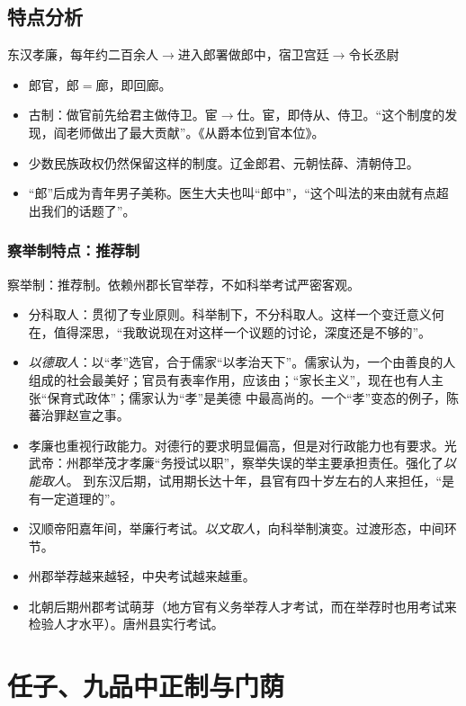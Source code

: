 \documentclass[twoside]{article}
\begin{document}
\subsection{特点分析}
东汉孝廉，每年约二百余人$\rightarrow$进入郎署做郎中，宿卫宫廷$\rightarrow$令长丞尉
\begin{itemize}
	\item 郎官，郎$=$廊，即回廊。
	\item 古制：做官前先给君主做侍卫。宦$\rightarrow$仕。宦，即侍从、侍卫。``这个制度的发现，阎老师做出了最大贡献''。《从爵本位到官本位》。
	\item 少数民族政权仍然保留这样的制度。辽金郎君、元朝怯薛、清朝侍卫。
	\item ``郎''后成为青年男子美称。医生大夫也叫``郎中''，``这个叫法的来由就有点超出我们的话题了''。
\end{itemize}
\subsubsection{察举制特点：推荐制}
察举制：推荐制。依赖州郡长官举荐，不如科举考试严密客观。
\begin{itemize}
	\item 分科取人：贯彻了专业原则。科举制下，不分科取人。这样一个变迁意义何在，值得深思，``我敢说现在对这样一个议题的讨论，深度还是不够的''。
	\item \textit{以德取人}：以``孝''选官，合于儒家``以孝治天下''。儒家认为，一个由善良的人组成的社会最美好；官员有表率作用，应该由；``家长主义''，现在也有人主张``保育式政体''；儒家认为``孝''是美德
	中最高尚的。一个``孝''变态的例子，陈蕃治罪赵宣之事。
	\item 孝廉也重视行政能力。对德行的要求明显偏高，但是对行政能力也有要求。光武帝：州郡举茂才孝廉``务授试以职''，察举失误的举主要承担责任。强化了\textit{以能取人}。
	到东汉后期，试用期长达十年，县官有四十岁左右的人来担任，``是有一定道理的''。
	\item 汉顺帝阳嘉年间，举廉行考试。\textit{以文取人}，向科举制演变。过渡形态，中间环节。
\end{itemize}
\begin{itemize}
	\item 州郡举荐越来越轻，中央考试越来越重。
	\item 北朝后期州郡考试萌芽（地方官有义务举荐人才考试，而在举荐时也用考试来检验人才水平）。唐州县实行考试。
\end{itemize}

\section{任子、九品中正制与门荫}
\end{document}
